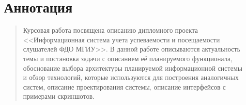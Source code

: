 \setcounter{page}{2}

\vspace*{1cm}
\section*{Аннотация}
\begin{quote} 
Курсовая работа посвящена описанию дипломного проекта <<Информационная система учета успеваемости и посещаемости слушателей ФДО МГИУ>>. В данной работе описываются актуальность темы и постановка задачи с описанием её планируемого функционала, обоснование выбора архитектуры планируемой информационной системы и обзор технологий, которые используются для построения аналогичных систем, описание проектирования системы, описание интерфейсов с примерами скриншотов.\\
{\em
}
\end{quote}
\newpage
\tableofcontents*
\endinput
